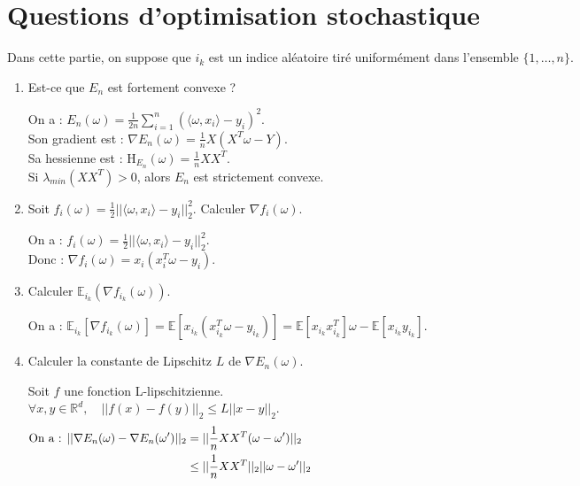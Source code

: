 \documentclass[12pt,a4paper]{article}
\begin{document}
\section{Questions d’optimisation stochastique}

Dans cette partie, on suppose que $i_k$ est un indice aléatoire tiré uniformément dans l’ensemble $\{1, \dots , n\}$.

\begin{enumerate}
    \color{black}
    \item Est-ce que $E_n$ est fortement convexe ?
    
    \color{blue}
    On a : $E_n(\omega) = \frac{1}{2n} \sum_{i = 1}^{n} (\langle \omega, x_i \rangle - y_i)^2$.\\
    Son gradient est : $\nabla E_n(\omega) = \frac{1}{n} X(X^T \omega - Y)$.\\
    Sa hessienne est : $\text{H}_{E_n}(\omega) = \frac{1}{n} X X^T$.\\
    Si $\lambda_{min}(X X^T) > 0$, alors $E_n$ est strictement convexe.\\

    \color{black}
    \item Soit $f_i(\omega) = \frac{1}{2}||\langle \omega, x_i \rangle - y_i||_2^2$.
    Calculer $\nabla f_i(\omega)$.

    \color{blue}
    On a : $f_i(\omega) = \frac{1}{2}||\langle \omega, x_i \rangle - y_i||_2^2$.\\
    Donc : $\nabla f_i(\omega) = x_i(x_i^T \omega - y_i)$.\\

    \color{black}
    \item Calculer $\mathbb{E}_{i_k} (\nabla f_{i_k} (\omega))$.
    
    \color{blue}
    On a : $\mathbb{E}_{i_k} \left[\nabla f_{i_k} (\omega)\right] = \mathbb{E} \left[x_{i_k}(x_{i_k}^T \omega - y_{i_k})\right]
    = \mathbb{E} \left[x_{i_k}x_{i_k}^T \right] \omega - \mathbb{E} \left[x_{i_k}y_{i_k}\right]$.\\

    \color{black}
    \item Calculer la constante de Lipschitz $L$ de $\nabla E_n(\omega)$.
    
    \color{blue}
    Soit $f$ une fonction L-lipschitzienne.\\
    $\forall x, y \in \mathbb{R}^d, \quad ||f(x) - f(y)||_2 \leq L ||x - y||_2$.\\

    \begin{align*}
        \text{On a : } ||\nabla E_n(\omega) - \nabla E_n(\omega')||_2 &= ||\frac{1}{n} XX^T (\omega - \omega')||_2 \hspace{14.5cm}\\
        &\leq ||\frac{1}{n} XX^T||_2 ||\omega - \omega'||_2
    \end{align*}


\end{enumerate}
\end{document}
